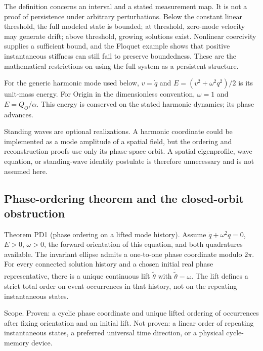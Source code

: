 \documentclass[aip,adv,preprint,floatfix]{revtex4-2}
\begin{document}
The definition concerns an interval and a stated measurement map. It is not a proof of persistence under arbitrary perturbations. Below the constant linear threshold, the full modeled state is bounded; at threshold, zero-mode velocity may generate drift; above threshold, growing solutions exist. Nonlinear coercivity supplies a sufficient bound, and the Floquet example shows that positive instantaneous stiffness can still fail to preserve boundedness. These are the mathematical restrictions on using the full system as a persistent structure.

For the generic harmonic mode used below, $v=\dot q$ and $E=(v^2+\omega^2q^2)/2$ is its unit-mass energy. For Origin in the dimensionless convention, $\omega=1$ and $E=Q_O/\alpha$. This energy is conserved on the stated harmonic dynamics; its phase advances.

Standing waves are optional realizations. A harmonic coordinate could be implemented as a mode amplitude of a spatial field, but the ordering and reconstruction proofs use only its phase-space orbit. A spatial eigenprofile, wave equation, or standing-wave identity postulate is therefore unnecessary and is not assumed here.

\subsection*{Phase-ordering theorem and the closed-orbit obstruction}
Theorem PD1 (phase ordering on a lifted mode history). Assume $\ddot q+\omega^2q=0$, $E>0$, $\omega>0$, the forward orientation of this equation, and both quadratures available. The invariant ellipse admits a one-to-one phase coordinate modulo $2\pi$. For every connected solution history and a chosen initial real phase representative, there is a unique continuous lift $\widetilde\theta$ with $\dot{\widetilde\theta}=\omega$. The lift defines a strict total order on event occurrences in that history, not on the repeating instantaneous states.

Scope. Proven: a cyclic phase coordinate and unique lifted ordering of occurrences after fixing orientation and an initial lift. Not proven: a linear order of repeating instantaneous states, a preferred universal time direction, or a physical cycle-memory device.
\end{document}
